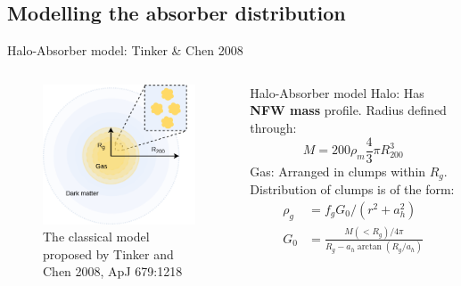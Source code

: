 \documentclass{beamer}
\begin{document}
	\subsection{Modelling the absorber distribution}
		\begin{frame}{Halo-Absorber model: Tinker \& Chen 2008}
			\begin{columns}
				\begin{column}{0.5\textwidth}
					\begin{figure}
						\includegraphics[width=\textwidth]{halo-model.png}
						\caption{\tiny The classical model proposed by Tinker and Chen 2008, ApJ 679:1218}
					\end{figure}
				\end{column}
				\begin{column}{0.5\textwidth}
					\begin{block}{Halo-Absorber model}
						Halo: Has \textbf{NFW mass} profile. Radius defined through:
						$$
							M=200\rho_m\frac{4}{3}\pi R_{200}^3
						$$
						Gas: Arranged in clumps within $R_g$. Distribution of clumps is of the form:
						$$
						\begin{aligned}
							\rho_g &= f_gG_0/(r^2+a_h^2)\\
							G_0 &= \frac{M(<R_g)/4\pi}{R_g-a_h\arctan(R_g/a_h)}\\
						\end{aligned}
						$$
					\end{block}
				\end{column}
			\end{columns}
		\end{frame}
\end{document}
